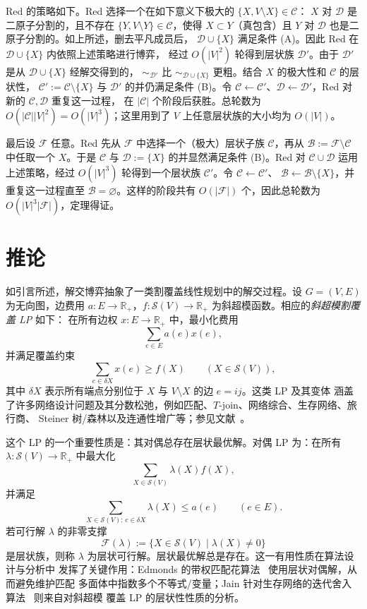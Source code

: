 \documentclass[UTF8,11pt,a4paper]{ctexart}
\numberwithin{equation}{section}
\newcommand{\calS}{\mathcal S}
\newcommand{\calF}{\mathcal F}
\newcommand{\calB}{\mathcal B}
\newcommand{\calC}{\mathcal C}
\newcommand{\calD}{\mathcal D}
\newcommand{\R}{\mathbb R}
\begin{document}
Red 的策略如下。Red 选择一个在如下意义下极大的 $\{X,V\setminus X\}\in\calC$：
$X$ 对 $\calD$ 是二原子分割的，且不存在 $\{Y,V\setminus Y\}\in\calC$，使得
$X\subset Y$（真包含）且 $Y$ 对 $\calD$ 也是二原子分割的。如上所述，删去平凡成员后，
$\calD\cup\{X\}$ 满足条件 (A)。因此 Red 在 $\calD\cup\{X\}$ 内依照上述策略进行博弈，
经过 $O(|V|^2)$ 轮得到层状族 $\calD'$。由于 $\calD'$ 是从 $\calD\cup\{X\}$ 经解交得到的，
$\sim_{\calD'}$ 比 $\sim_{\calD\cup\{X\}}$ 更粗。结合 $X$ 的极大性和 $\calC$ 的层状性，
$\calC':=\calC\setminus\{X\}$ 与 $\calD'$ 的并仍满足条件 (B)。令
$\calC\leftarrow\calC'$、$\calD\leftarrow\calD'$，Red 对新的 $\calC,\calD$ 重复这一过程，
在 $|\calC|$ 个阶段后获胜。总轮数为
$O(|\calC||V|^2)=O(|V|^3)$；这里用到了 $V$ 上任意层状族的大小均为 $O(|V|)$。

最后设 $\calF$ 任意。Red 先从 $\calF$ 中选择一个（极大）层状子族 $\calC$，再从
$\calB:=\calF\setminus\calC$ 中任取一个 $X$。于是 $\calC$ 与
$\calD:=\{X\}$ 的并显然满足条件 (B)。Red 对 $\calC\cup\calD$ 运用上述策略，经过
$O(|V|^3)$ 轮得到一个层状族 $\calC'$。令 $\calC\leftarrow\calC'$、
$\calB\leftarrow\calB\setminus\{X\}$，并重复这一过程直至 $\calB=\varnothing$。这样的阶段共有
$O(|\calF|)$ 个，因此总轮数为 $O(|V|^3|\calF|)$，定理得证。

\section{推论}

如引言所述，解交博弈抽象了一类割覆盖线性规划中的解交过程。设 $G=(V,E)$ 为无向图，边费用
$a:E\to\R_+$，$f:\calS(V)\to\R_+$ 为斜超模函数。相应的\emph{斜超模割覆盖 LP} 如下：
在所有边权 $x:E\to\R_+$ 中，最小化费用
\[
\sum_{e\in E}a(e)x(e),
\]
并满足覆盖约束
\[
\sum_{e\in\delta X}x(e)\ge f(X)\qquad(X\in\calS(V)),
\]
其中 $\delta X$ 表示所有端点分别位于 $X$ 与 $V\setminus X$ 的边 $e=ij$。这类 LP 及其变体
涵盖了许多网络设计问题及其分数松弛，例如匹配、$T$-join、网络综合、生存网络、旅行商、
Steiner 树/森林以及连通性增广等；参见文献~\cite{Jain,Schrijver}。

这个 LP 的一个重要性质是：其对偶总存在层状最优解。对偶 LP 为：在所有
$\lambda:\calS(V)\to\R_+$ 中最大化
\[
\sum_{X\in\calS(V)}\lambda(X)f(X),
\]
并满足
\[
\sum_{X\in\calS(V):\,e\in\delta X}\lambda(X)\le a(e)\qquad(e\in E).
\]
若可行解 $\lambda$ 的非零支撑
\[
\calF(\lambda):=\{X\in\calS(V)\mid\lambda(X)\ne0\}
\]
是层状族，则称 $\lambda$ 为层状可行解。层状最优解总是存在。这一有用性质在算法设计与分析中
发挥了关键作用：Edmonds 的带权匹配花算法~\cite{Edmonds} 使用层状对偶解，从而避免维护匹配
多面体中指数多个不等式/变量；Jain 针对生存网络的迭代舍入算法~\cite{Jain} 则来自对斜超模
覆盖 LP 的层状性性质的分析。
\end{document}
